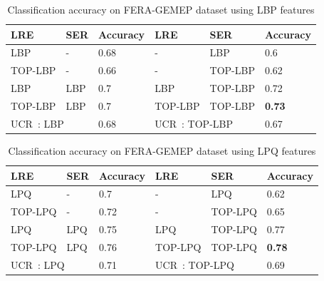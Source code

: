 \documentclass[journal]{IEEEtran}
\begin{document}


\begin{table}[!t]
\caption{Classification accuracy on FERA-GEMEP dataset using LBP features\label{table:comp_lbp}}
\centering
\scriptsize
\begin{tabular}{lll||lll}
\toprule
LRE & SER & Accuracy	& LRE	& SER	& Accuracy \\ \midrule 
LBP	& -		& 0.68	& - & LBP & 0.6 \\
TOP-LBP & - & 0.66 & - & TOP-LBP & 0.62 \\
LBP & LBP & 0.7 & LBP & TOP-LBP & 0.72 \\
TOP-LBP & LBP & 0.7 & TOP-LBP & TOP-LBP & \textbf{0.73} \\ \midrule
\multicolumn{2}{l}{UCR~\cite{Yang_SMCB12}: LBP} & 0.68 & \multicolumn{2}{l}{UCR~\cite{Yang_SMCB12}: TOP-LBP} & 0.67 \\
\bottomrule

\end{tabular}
\end{table}


\begin{table}[!t]
\caption{Classification accuracy on FERA-GEMEP dataset using LPQ features\label{table:comp_lpq}}
\centering
\scriptsize
\begin{tabular}{lll||lll}
\toprule
LRE & SER & Accuracy	& LRE	& SER	& Accuracy \\ \midrule 
LPQ	& -		& 0.7	& - & LPQ & 0.62 \\
TOP-LPQ & - & 0.72 & - & TOP-LPQ & 0.65 \\
LPQ & LPQ & 0.75 & LPQ & TOP-LPQ & 0.77 \\
TOP-LPQ & LPQ & 0.76 & TOP-LPQ & TOP-LPQ & \textbf{0.78} \\ \midrule
\multicolumn{2}{l}{UCR~\cite{Yang_SMCB12}: LPQ} & 0.71 & \multicolumn{2}{l}{UCR~\cite{Yang_SMCB12}: TOP-LPQ} & 0.69 \\
\bottomrule

\end{tabular}
\end{table}
\end{document}
